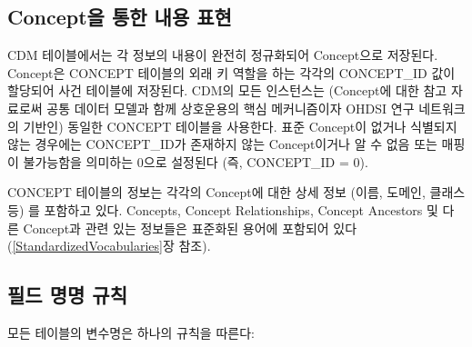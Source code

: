 \documentclass[11pt]{book}
\theoremstyle{definition}
\theoremstyle{definition}
\theoremstyle{definition}
\theoremstyle{remark}
\begin{document}
\subsection{Concept을 통한 내용 표현}\label{concept---}

CDM 테이블에서는 각 정보의 내용이 완전히 정규화되어 Concept으로
저장된다. Concept은 CONCEPT 테이블의 외래 키 역할을 하는 각각의
CONCEPT\_ID 값이 할당되어 사건 테이블에 저장된다. CDM의 모든 인스턴스는
(Concept에 대한 참고 자료로써 공통 데이터 모델과 함께 상호운용의 핵심
메커니즘이자 OHDSI 연구 네트워크의 기반인) 동일한 CONCEPT 테이블을
사용한다. 표준 Concept이 없거나 식별되지 않는 경우에는 CONCEPT\_ID가
존재하지 않는 Concept이거나 알 수 없음 또는 매핑이 불가능함을 의미하는
0으로 설정된다 (즉, CONCEPT\_ID = 0).

CONCEPT 테이블의 정보는 각각의 Concept에 대한 상세 정보 (이름, 도메인,
클래스 등) 를 포함하고 있다. Concepts, Concept Relationships, Concept
Ancestors 및 다른 Concept과 관련 있는 정보들은 표준화된 용어에 포함되어
있다 (\ref{StandardizedVocabularies}장 참조).

\subsection{필드 명명 규칙}\label{--}

모든 테이블의 변수명은 하나의 규칙을 따른다:
\end{document}
